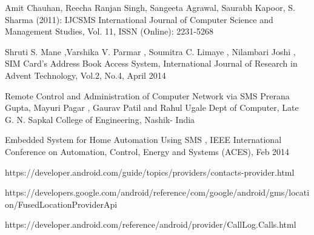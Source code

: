 

{}
\begin{thebibliography}{99}

Amit Chauhan, Reecha Ranjan Singh, Sangeeta
Agrawal, Saurabh Kapoor, S. Sharma (2011):
IJCSMS International Journal of Computer Science
and Management Studies, Vol. 11, ISSN
(Online): 2231-5268

Shruti S. Mane
,Varshika V. Parmar
, Soumitra C. Limaye
, Nilambari Joshi ,  SIM Card’s
Address Book Access System, International Journal of Research in Advent Technology, Vol.2, No.4, April 2014 


Remote Control and Administration of Computer Network via SMS
Prerana Gupta, Mayuri Pagar
, Gaurav Patil
and Rahul Ugale 
Dept of Computer, Late G. N. Sapkal College of Engineering, Nashik- India 

Embedded System for Home Automation
Using SMS
, IEEE International Conference on Automation, Control, Energy and Systems (ACES), Feb 2014

https://developer.android.com/guide/topics/providers/contacts-provider.html

https://developers.google.com/android/reference/com/google/android/gms/location/FusedLocationProviderApi

https://developer.android.com/reference/android/provider/CallLog.Calls.html

\end{thebibliography}

